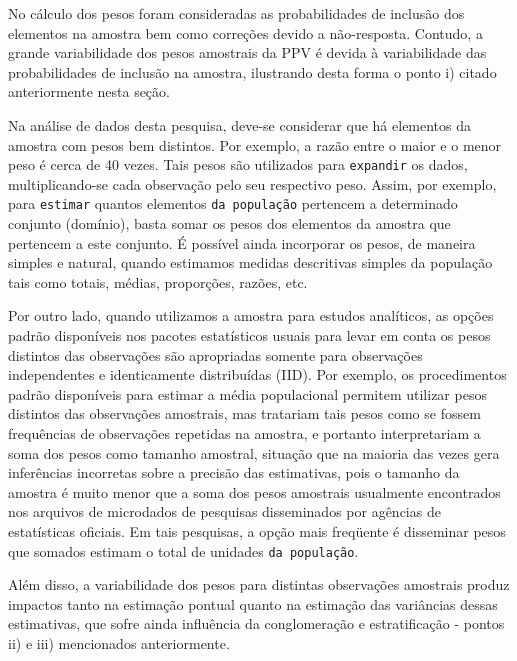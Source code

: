 \documentclass[]{book}
\theoremstyle{definition}
\theoremstyle{definition}
\theoremstyle{remark}
\begin{document}
No cálculo dos pesos foram consideradas as probabilidades de inclusão
dos elementos na amostra bem como correções devido a não-resposta.
Contudo, a grande variabilidade dos pesos amostrais da PPV é devida à
variabilidade das probabilidades de inclusão na amostra, ilustrando
desta forma o ponto i) citado anteriormente nesta seção.

Na análise de dados desta pesquisa, deve-se considerar que há elementos
da amostra com pesos bem distintos. Por exemplo, a razão entre o maior e
o menor peso é cerca de 40 vezes. Tais pesos são utilizados para
\texttt{expandir} os dados, multiplicando-se cada observação pelo seu
respectivo peso. Assim, por exemplo, para \texttt{estimar} quantos
elementos \texttt{da\ população} pertencem a determinado conjunto
(domínio), basta somar os pesos dos elementos da amostra que pertencem a
este conjunto. É possível ainda incorporar os pesos, de maneira simples
e natural, quando estimamos medidas descritivas simples da população
tais como totais, médias, proporções, razões, etc.

Por outro lado, quando utilizamos a amostra para estudos analíticos, as
opções padrão disponíveis nos pacotes estatísticos usuais para levar em
conta os pesos distintos das observações são apropriadas somente para
observações independentes e identicamente distribuídas (IID). Por
exemplo, os procedimentos padrão disponíveis para estimar a média
populacional permitem utilizar pesos distintos das observações
amostrais, mas tratariam tais pesos como se fossem frequências de
observações repetidas na amostra, e portanto interpretariam a soma dos
pesos como tamanho amostral, situação que na maioria das vezes gera
inferências incorretas sobre a precisão das estimativas, pois o tamanho
da amostra é muito menor que a soma dos pesos amostrais usualmente
encontrados nos arquivos de microdados de pesquisas disseminados por
agências de estatísticas oficiais. Em tais pesquisas, a opção mais
freqüente é disseminar pesos que somados estimam o total de unidades
\texttt{da\ população}.

Além disso, a variabilidade dos pesos para distintas observações
amostrais produz impactos tanto na estimação pontual quanto na estimação
das variâncias dessas estimativas, que sofre ainda influência da
conglomeração e estratificação - pontos ii) e iii) mencionados
anteriormente.
\end{document}
